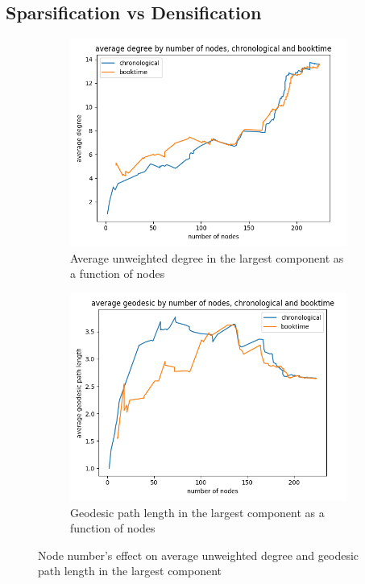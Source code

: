 \subsection{Sparsification vs Densification}
\begin{figure}[ht]
    \centering
    \begin{subfigure}{0.4\textwidth}
        \includegraphics[width=1.\textwidth]{images/n_vs_avg_degree-weighted_False.png}
        \caption{Average unweighted degree in the largest component as a function of nodes}
    \end{subfigure}
    \begin{subfigure}{0.4\textwidth}
        \includegraphics[width=1.\textwidth]{images/n_vs_geodesic-weighted_False.png}
        \caption{Geodesic path length in the largest component as a function of nodes}
    \end{subfigure}
    \caption{Node number's effect on average unweighted degree and geodesic path length in the largest component}
    \label{sparsification-densification}
\end{figure}

